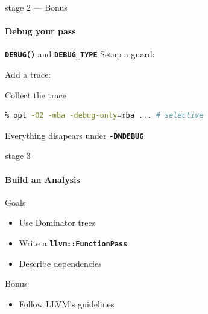 \documentclass[14pt]{beamer}
\newcommand{\Code}[1]{\textbf{\texttt{#1}}}
\begin{document}
    \begin{frame}[containsverbatim]{stage 2 --- Bonus}
        \framesubtitle{Debug your pass}
        \begin{alertblock}{\Code{DEBUG()} and \Code{DEBUG\_TYPE}}
        Setup a guard:
        {
        \footnotesize
        
        }
        Add a trace:\\
        \hspace{-6em}%
        \begin{minipage}{\textwidth}
        \footnotesize
        
        \end{minipage}
        \end{alertblock}
        \begin{block}{Collect the trace}
        {
        \footnotesize
        \begin{lstlisting}[language=bash]
% opt -O2 -mba -debug ... # verbose
% opt -O2 -mba -debug-only=mba ... # selective
        \end{lstlisting}
        }
        \end{block}
        Everything disapears under \Code{-DNDEBUG}
    \end{frame}


    \begin{frame}{stage 3}

        \framesubtitle{Build an Analysis}

        \begin{block}{Goals}
            \begin{itemize}
                \item Use Dominator trees
                \item Write a \Code{llvm::FunctionPass}
                \item Describe dependencies
            \end{itemize}
        \end{block}

        \begin{alertblock}{Bonus}
            \begin{itemize}
                \item Follow LLVM's guidelines
            \end{itemize}
        \end{alertblock}

    \end{frame}
\end{document}
